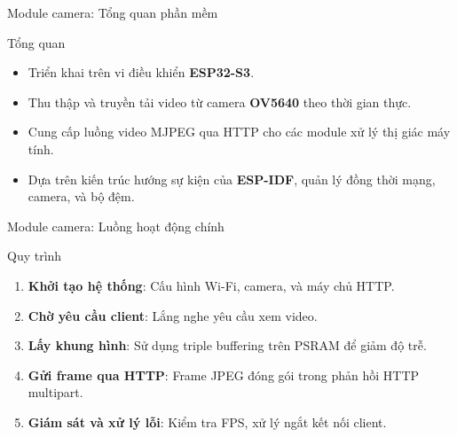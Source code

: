 \begin{frame}{Module camera: Tổng quan phần mềm}
    \begin{block}{Tổng quan}
        \begin{itemize}
            \item Triển khai trên vi điều khiển \textbf{ESP32-S3}.
            \item Thu thập và truyền tải video từ camera \textbf{OV5640} theo thời gian thực.
            \item Cung cấp luồng video MJPEG qua HTTP cho các module xử lý thị giác máy tính.
            \item Dựa trên kiến trúc hướng sự kiện của \textbf{ESP-IDF}, quản lý đồng thời mạng, camera, và bộ đệm.
        \end{itemize}
    \end{block}
    \label{sec:module_ii_software}
\end{frame}

\begin{frame}[fragile]{Module camera: Luồng hoạt động chính}
    \begin{block}{Quy trình}
        \begin{enumerate}
            \item \textbf{Khởi tạo hệ thống}: Cấu hình Wi-Fi, camera, và máy chủ HTTP.
            \item \textbf{Chờ yêu cầu client}: Lắng nghe yêu cầu xem video.
            \item \textbf{Lấy khung hình}: Sử dụng triple buffering trên PSRAM để giảm độ trễ.
            \item \textbf{Gửi frame qua HTTP}: Frame JPEG đóng gói trong phản hồi HTTP multipart.
            \item \textbf{Giám sát và xử lý lỗi}: Kiểm tra FPS, xử lý ngắt kết nối client.
        \end{enumerate}
    \end{block}
\end{frame}

